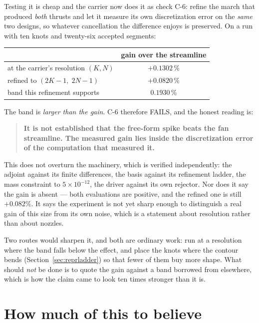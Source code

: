 Testing it is cheap and the carrier now does it as check C-6: refine
the march that produced \emph{both} thrusts and let it measure its own
discretization error on the \emph{same} two designs, so whatever
cancellation the difference enjoys is preserved. On a run with ten
knots and twenty-six accepted segments:

\begin{center}
\begin{tabular}{lc}
\toprule
 & gain over the streamline \\
\midrule
at the carrier's resolution $(K, N)$      & $+0.1302\,\%$ \\
refined to $(2K-1,\; 2N-1)$               & $+0.0820\,\%$ \\
\midrule
band this refinement supports             & $0.1930\,\%$ \\
\bottomrule
\end{tabular}
\end{center}

\noindent The band is \emph{larger than the gain}. C-6 therefore
FAILS, and the honest reading is:

\begin{quote}
\textbf{It is not established that the free-form spike beats the fan
streamline. The measured gain lies inside the discretization error of
the computation that measured it.}
\end{quote}

This does not overturn the machinery, which is verified independently:
the adjoint against its finite differences, the basis against its
refinement ladder, the mass constraint to $5\times10^{-12}$, the
driver against its own rejector. Nor does it say the gain is absent
--- both evaluations are positive, and the refined one is still
$+0.082\%$. It says the experiment is not yet sharp enough to
distinguish a real gain of this size from its own noise, which is a
statement about resolution rather than about nozzles.

Two routes would sharpen it, and both are ordinary work: run at a
resolution where the band falls below the effect, and place the knots
where the contour bends (Section~\ref{sec:reprladder}) so that fewer
of them buy more shape. What should \emph{not} be done is to quote the
gain against a band borrowed from elsewhere, which is how the claim
came to look ten times stronger than it is.

\section{How much of this to believe}

